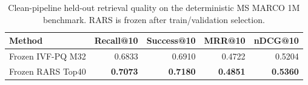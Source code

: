 \begin{table}[t]
\centering
\caption{Clean-pipeline held-out retrieval quality on the deterministic MS MARCO 1M benchmark. RARS is frozen after train/validation selection.}
\label{tab:clean-rars-main}
\begin{tabular}{lrrrr}
\toprule
Method & Recall@10 & Success@10 & MRR@10 & nDCG@10 \\
\midrule
Frozen IVF-PQ M32 & 0.6833 & 0.6910 & 0.4722 & 0.5204 \\
Frozen RARS Top40 & \textbf{0.7073} & \textbf{0.7180} & \textbf{0.4851} & \textbf{0.5360} \\
\bottomrule
\end{tabular}
\end{table}
